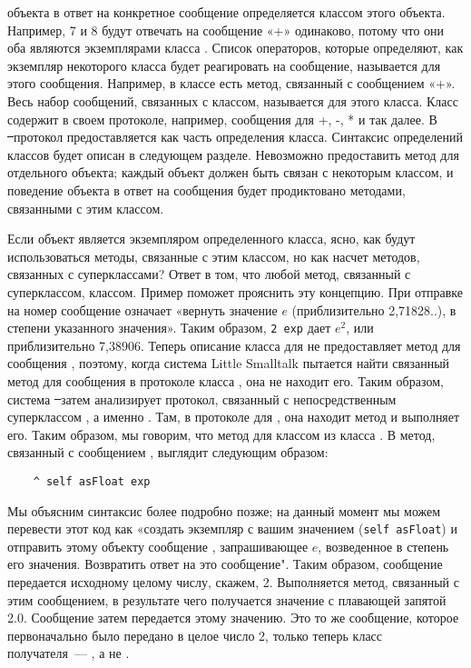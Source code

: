  объекта в ответ на конкретное сообщение определяется классом этого объекта. 
Например, 7 и 8 будут отвечать на сообщение «+» одинаково, потому что они оба 
являются экземплярами класса . Список операторов, которые определяют, 
как экземпляр некоторого класса будет реагировать на сообщение, называется 
для этого сообщения. Например, в классе  есть метод, связанный с 
сообщением «+». Весь набор сообщений, связанных с классом, называется 
для этого класса. Класс  содержит в своем протоколе, например, сообщения 
для +, -, * и так далее. В \st\ протокол предоставляется как часть определения 
класса. Синтаксис определений классов будет описан в следующем разделе. 
Невозможно предоставить метод для отдельного объекта; каждый объект должен 
быть связан с некоторым классом, и поведение объекта в ответ на сообщения будет 
продиктовано методами, связанными с этим классом.

Если объект является экземпляром определенного класса, ясно, как будут использоваться 
методы, связанные с этим классом, но как насчет методов, связанных с суперклассами? 
Ответ в том, что любой метод, связанный с суперклассом,  классом. 
Пример поможет прояснить эту концепцию. При отправке на номер сообщение 
означает «вернуть значение $e$ (приблизительно 2,71828..), в степени указанного 
значения». Таким образом, \verb|2 exp| дает $e^2$, или приблизительно 7,38906. Теперь 
описание класса для  не предоставляет метод для сообщения , поэтому, 
когда система Little Smalltalk пытается найти связанный метод для сообщения 
 в протоколе класса , она не находит его. Таким образом, система 
\st\ затем анализирует протокол, связанный с непосредственным 
суперклассом , а именно . Там, в протоколе для , она находит 
метод и выполняет его. Таким образом, мы говорим, что метод для  
классом  из класса .
В  метод, связанный с сообщением , выглядит следующим образом:
\begin{lstlisting}
    ^ self asFloat exp
\end{lstlisting}

Мы объясним синтаксис более подробно позже; на данный момент мы можем перевести 
этот код как «создать экземпляр  с вашим значением (\verb|self asFloat|) и 
отправить этому объекту сообщение , запрашивающее $e$, возведенное в степень 
его значения. Возвратить
ответ на это сообщение". Таким образом, сообщение  передается исходному 
целому числу, скажем, 2. Выполняется метод, связанный с этим сообщением, в 
результате чего получается значение с плавающей запятой 2.0. Сообщение  
затем передается этому значению. Это то же сообщение, которое первоначально 
было передано в целое число 2, только теперь класс получателя\ --- , 
а не .

